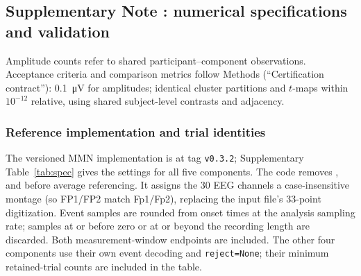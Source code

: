 \subsection*{Supplementary Note \thesuppnote: numerical specifications and validation}
\label{si:numerical}


Amplitude counts refer to shared participant--component observations. Acceptance criteria and comparison metrics follow Methods (``Certification contract''): \SI{0.1}{\uV} for amplitudes; identical cluster partitions and \(t\)-maps within \(10^{-12}\) relative, using shared subject-level contrasts and adjacency.

\subsubsection*{Reference implementation and trial identities}

The versioned MMN implementation is  at tag \texttt{v0.3.2}; Supplementary Table~\ref*{tab:spec} gives the settings for all five components. The code removes ,  and  before average referencing. It assigns the 30 EEG channels a case-insensitive  montage (so FP1/FP2 match Fp1/Fp2), replacing the input file's 33-point digitization. Event samples are rounded from onset times at the analysis sampling rate; samples at or before zero or at or beyond the recording length are discarded. Both measurement-window endpoints are included. The other four components use their own event decoding and \texttt{reject=None}; their minimum retained-trial counts are included in the table.

